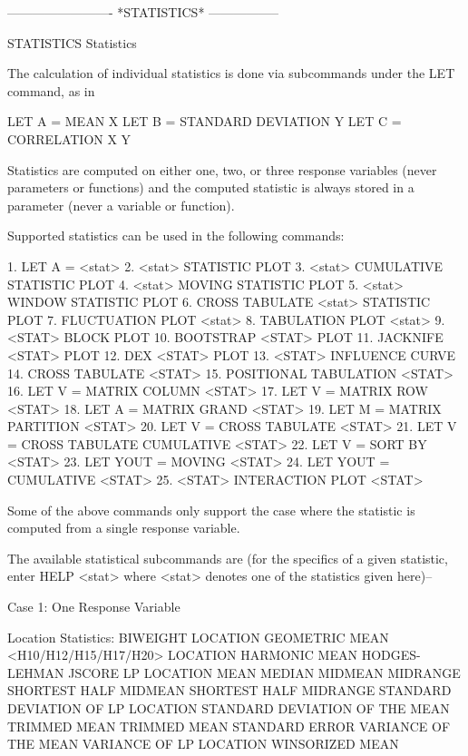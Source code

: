  
 
 


-------------------------  *STATISTICS*  -----------------
 
STATISTICS
Statistics
 
The calculation of individual statistics is done via subcommands under
the LET command, as in
 
   LET A = MEAN X
   LET B = STANDARD DEVIATION Y
   LET C = CORRELATION X Y
 
Statistics are computed on either one, two, or three response variables
(never parameters or functions) and the computed statistic is always
stored in a parameter (never a variable or function).

Supported statistics can be used in the following commands:

   1. LET A = <stat>
   2. <stat> STATISTIC PLOT
   3. <stat> CUMULATIVE STATISTIC PLOT
   4. <stat> MOVING STATISTIC PLOT
   5. <stat> WINDOW STATISTIC PLOT
   6. CROSS TABULATE <stat> STATISTIC PLOT
   7. FLUCTUATION PLOT <stat>
   8. TABULATION PLOT <stat>
   9. <STAT> BLOCK PLOT
  10. BOOTSTRAP <STAT> PLOT
  11. JACKNIFE <STAT> PLOT
  12. DEX <STAT> PLOT
  13. <STAT> INFLUENCE CURVE
  14. CROSS TABULATE <STAT>
  15. POSITIONAL TABULATION <STAT>
  16. LET V = MATRIX COLUMN <STAT>
  17. LET V = MATRIX ROW <STAT>
  18. LET A = MATRIX GRAND <STAT>
  19. LET M = MATRIX PARTITION <STAT>
  20. LET V = CROSS TABULATE <STAT>
  21. LET V = CROSS TABULATE CUMULATIVE <STAT>
  22. LET V = SORT BY <STAT>
  23. LET YOUT = MOVING <STAT>
  24. LET YOUT = CUMULATIVE <STAT>
  25. <STAT> INTERACTION PLOT <STAT>

Some of the above commands only support the case where the
statistic is computed from a single response variable.

The available statistical subcommands are (for the specifics of a
given statistic, enter HELP <stat> where <stat> denotes one of the
statistics given here)--
 
Case 1: One Response Variable

Location Statistics:
   BIWEIGHT LOCATION
   GEOMETRIC MEAN
   <H10/H12/H15/H17/H20> LOCATION
   HARMONIC MEAN
   HODGES-LEHMAN
   JSCORE
   LP LOCATION
   MEAN
   MEDIAN
   MIDMEAN
   MIDRANGE
   SHORTEST HALF MIDMEAN
   SHORTEST HALF MIDRANGE
   STANDARD DEVIATION OF LP LOCATION
   STANDARD DEVIATION OF THE MEAN
   TRIMMED MEAN
   TRIMMED MEAN STANDARD ERROR
   VARIANCE OF THE MEAN
   VARIANCE OF LP LOCATION
   WINSORIZED MEAN

